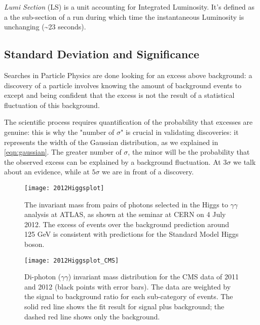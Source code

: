 \textit{Lumi Section} (LS) \label{ls_def} is a unit accounting for Integrated Luminosity. It's defined as a the sub-section of a run during which time the instantaneous Luminosity is unchanging (\~{}23 seconds).

\subsection{Standard Deviation and Significance}

Searches in Particle Physics are done looking for an excess above background: a discovery of a particle involves knowing the amount of background events to except and being confident that the excess is not the result of a statistical fluctuation of this background.


The scientific process requires quantification of the probability that excesses are genuine: this is why the "number of $\sigma$" is crucial in validating discoveries: it represents the width of the Gaussian distribution, as we explained in \ref{eqn:gaussian}. The greater number of $\sigma$, the minor will be the probability that the observed excess can be explained by a background fluctuation.
At $3\sigma$ we talk about an evidence, while at $5\sigma$ we are in front of a discovery.

\begin{figure}
	\centerline{
		\texttt{[image: 2012Higgsplot]}}
	\caption{The invariant mass from pairs of photons selected in the Higgs to $\gamma\gamma$ analysis at ATLAS, as shown at the seminar at CERN on 4 July 2012. The excess of events over the background prediction around 125 GeV is consistent with predictions for the Standard Model Higgs boson.\cite{Collaboration:2627611}}
\end{figure}

\begin{figure}
	\centerline{
		\texttt{[image: 2012Higgsplot\_CMS]}}
	\caption{Di-photon ($\gamma\gamma$) invariant mass distribution for the CMS data of 2011 and 2012 (black points with error bars). The data are weighted by the signal to background ratio for each sub-category of events. The solid red line shows the fit result for signal plus background; the dashed red line shows only the background. \cite{Collaboration:1459463}}
\end{figure}


